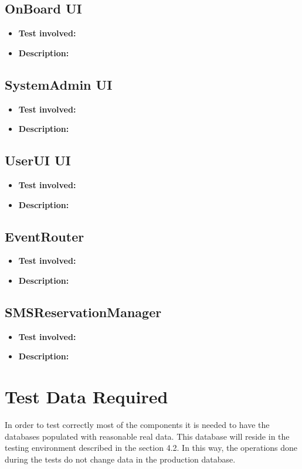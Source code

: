 \subsection{OnBoard UI}
\begin{itemize}
\item \textbf{Test involved:}
\item \textbf{Description:}
\end{itemize}

\subsection{SystemAdmin UI}
\begin{itemize}
\item \textbf{Test involved:}
\item \textbf{Description:}
\end{itemize}

\subsection{UserUI UI}
\begin{itemize}
\item \textbf{Test involved:}
\item \textbf{Description:}
\end{itemize}

\subsection{EventRouter}
\begin{itemize}
\item \textbf{Test involved:}
\item \textbf{Description:}
\end{itemize}

\subsection{SMSReservationManager}
\begin{itemize}
\item \textbf{Test involved:}
\item \textbf{Description:}
\end{itemize}

\section{Test Data Required}
In order to test correctly most of the components it is needed to have the databases populated with reasonable real data.
This database will reside in the testing environment described in the section 4.2. In this way, the operations done during the tests do not change data in the production database.
